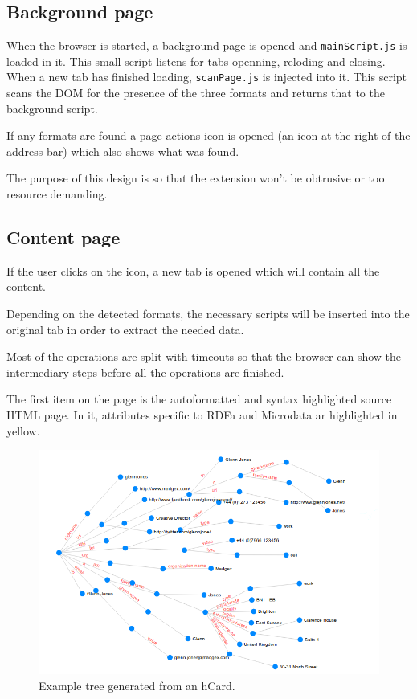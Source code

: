 \documentclass[12pt]{article}
\newcommand{\co}[1]{\texttt{#1}}
\begin{document}
\subsection{Background page}

When the browser is started, a background page is opened and \co{mainScript.js}
is loaded in it. This small script listens for tabs openning, reloding and
closing. When a new tab has finished loading, \co{scanPage.js} is injected into
it. This script scans the DOM for the presence of the three formats and returns
that to the background script.

If any formats are found a page actions icon is opened (an icon at the right of
the address bar) which also shows what was found.

The purpose of this design is so that the extension won't be obtrusive or too
resource demanding.

\subsection{Content page}

If the user clicks on the icon, a new tab is opened which will contain all the
content.

Depending on the detected formats, the necessary scripts will be inserted into
the original tab in order to extract the needed data.

Most of the operations are split with timeouts so that the browser can show the
intermediary steps before all the operations are finished.

The first item on the page is the autoformatted and syntax highlighted source
HTML page. In it, attributes specific to RDFa and Microdata ar highlighted in
yellow.

\begin{figure}[t!]
    \centering
    \includegraphics[width=13cm]{tree}
    \caption{Example tree generated from an hCard.}
    \label{treeEx}
\end{figure}
\end{document}
